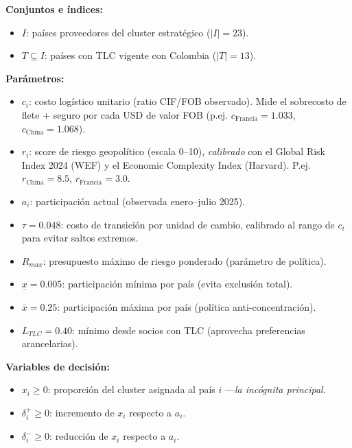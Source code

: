 \documentclass[11pt,a4paper]{article}
\begin{document}
\vspace{0.1cm}
\noindent\textbf{Conjuntos e índices:}
\vspace{-0.1cm}
\begin{itemize}[noitemsep,topsep=0pt,leftmargin=1.3em]
\footnotesize
\item $I$: países proveedores del cluster estratégico ($|I| = 23$).
\item $T \subseteq I$: países con TLC vigente con Colombia ($|T| = 13$).
\end{itemize}

\vspace{0.1cm}
\noindent\textbf{Parámetros:}
\vspace{-0.1cm}
\begin{itemize}[noitemsep,topsep=0pt,leftmargin=1.3em]
\footnotesize
\item $c_i$: costo logístico unitario (ratio CIF/FOB observado). Mide el sobrecosto de flete + seguro por cada USD de valor FOB (p.ej. $c_{\text{Francia}}=1.033$, $c_{\text{China}}=1.068$).
\item $r_i$: score de riesgo geopolítico (escala 0--10), \emph{calibrado} con el Global Risk Index 2024 (WEF) y el Economic Complexity Index (Harvard). P.ej. $r_{\text{China}}=8.5$, $r_{\text{Francia}}=3.0$.
\item $a_i$: participación actual (observada enero--julio 2025).
\item $\tau = 0.048$: costo de transición por unidad de cambio, calibrado al rango de $c_i$ para evitar saltos extremos.
\item $R_{max}$: presupuesto máximo de riesgo ponderado (parámetro de política).
\item $\underline{x}=0.005$: participación mínima por país (evita exclusión total).
\item $\bar{x}=0.25$: participación máxima por país (política anti-concentración).
\item $L_{TLC}=0.40$: mínimo desde socios con TLC (aprovecha preferencias arancelarias).
\end{itemize}

\vspace{0.1cm}
\noindent\textbf{Variables de decisión:}
\vspace{-0.1cm}
\begin{itemize}[noitemsep,topsep=0pt,leftmargin=1.3em]
\footnotesize
\item $x_i \geq 0$: proporción del cluster asignada al país $i$ ---\emph{la incógnita principal}.
\item $\delta_i^+ \geq 0$: incremento de $x_i$ respecto a $a_i$.
\item $\delta_i^- \geq 0$: reducción de $x_i$ respecto a $a_i$.
\end{itemize}
\end{document}
